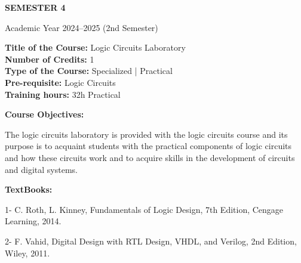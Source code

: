 \documentclass[12pt,a4paper]{article}
\begin{document}
\newpage
\vspace*{\fill}
\begin{center}
  {\fontsize{28pt}{34pt}\selectfont \textbf{SEMESTER 4}}\par\vspace{12pt}
  {\fontsize{13pt}{17pt}\selectfont Academic Year 2024–2025 (2nd Semester)}
\end{center}
\vspace*{\fill}

\newpage
\textbf{Title of the Course:} Logic Circuits Laboratory\\
\textbf{Number of Credits:} 1\\
\textbf{Type of the Course:} Specialized | Practical\\
\textbf{Pre-requisite:} Logic Circuits\\
\textbf{Training hours:} 32h Practical\par\vspace{4pt}
\textbf{Course Objectives:}\par\vspace{2pt}
The logic circuits laboratory is provided with the logic circuits course and its purpose is to acquaint
students with the practical components of logic circuits and how these circuits work and to acquire
skills in the development of circuits and digital systems.\par\vspace{4pt}
\textbf{TextBooks:}\par\vspace{2pt}
1- C. Roth, L. Kinney, Fundamentals of Logic Design, 7th Edition, Cengage Learning, 2014.\par
2- F. Vahid, Digital Design with RTL Design, VHDL, and Verilog, 2nd Edition, Wiley, 2011.\par
\vspace{4pt}
\end{document}
